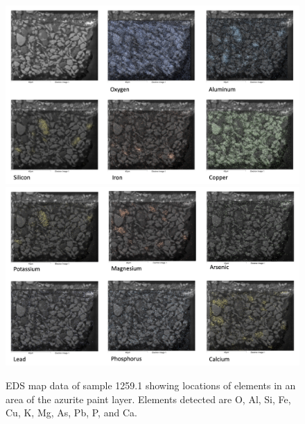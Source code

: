 \begin{figure}[H]
\centering
\begin{minipage}[t]{\linewidth}
  \centering
  \includegraphics[width=0.9\linewidth]{1259.1_mapdata_1}
\hfill
\includegraphics[width=0.9\linewidth]{1259.1_mapdata_2}
\hfill
\end{minipage}
\caption[EDS map data, sample 1259.1.]{EDS map data of sample 1259.1 showing locations of elements in an area of the azurite paint layer. Elements detected are O, Al, Si, Fe, Cu, K, Mg, As, Pb, P, and Ca.}
\label{fig:1259.1_mapdata}
\end{figure}

